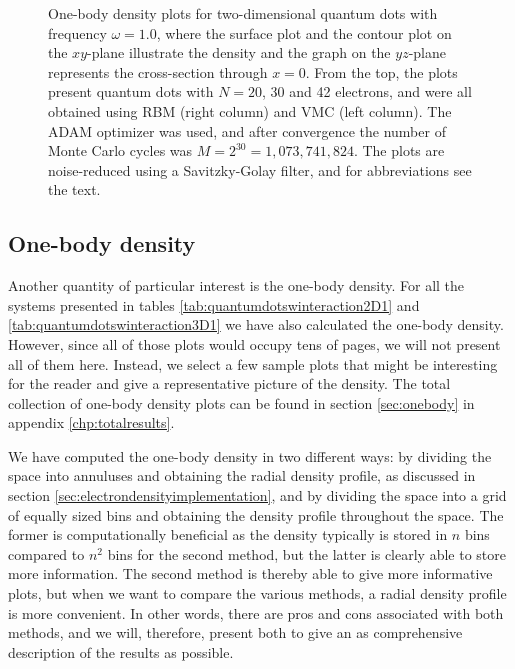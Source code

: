 \begin{figure}
	\caption{One-body density plots for two-dimensional quantum dots with frequency $\omega=1.0$, where the surface plot and the contour plot on the $xy$-plane illustrate the density and the graph on the $yz$-plane represents the cross-section through $x=0$. From the top, the plots present quantum dots with $N=20$, 30 and 42 electrons, and were all obtained using RBM (right column) and VMC (left column). The ADAM optimizer was used, and after convergence the number of Monte Carlo cycles was $M=2^{30}=1,073,741,824$. The plots are noise-reduced using a Savitzky-Golay filter, and for abbreviations see the text.}
	\label{fig:OB_interaction_1p0w2}
\end{figure}

\subsection{One-body density} \label{sec:onebodyresults}
Another quantity of particular interest is the one-body density. For all the systems presented in tables \eqref{tab:quantumdotswinteraction2D1} and \eqref{tab:quantumdotswinteraction3D1} we have also calculated the one-body density. However, since all of those plots would occupy tens of pages, we will not present all of them here. Instead, we select a few sample plots that might be interesting for the reader and give a representative picture of the density. The total collection of one-body density plots can be found in section \ref{sec:onebody} in appendix \ref{chp:totalresults}. 

We have computed the one-body density in two different ways: by dividing the space into annuluses and obtaining the radial density profile, as discussed in section \ref{sec:electrondensityimplementation}, and by dividing the space into a grid of equally sized bins and obtaining the density profile throughout the space. The former is computationally beneficial as the density typically is stored in $n$ bins compared to $n^2$ bins for the second method, but the latter is clearly able to store more information. The second method is thereby able to give more informative plots, but when we want to compare the various methods, a radial density profile is more convenient. In other words, there are pros and cons associated with both methods, and we will, therefore, present both to give an as comprehensive description of the results as possible. 

